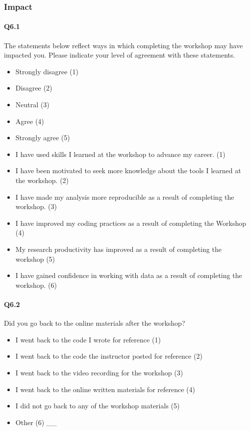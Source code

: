 \documentclass[030-workshop.tex]{subfiles}
\begin{document}
\subsubsection{Impact}

    \paragraph{Q6.1}

        The statements below reflect ways in which completing the workshop may have impacted you.
        Please indicate your level of agreement with these statements.

        \begin{itemize}
            \item Strongly disagree (1)
            \item Disagree (2)
            \item Neutral (3)
            \item Agree (4)
            \item Strongly agree (5)
        \end{itemize}

        \begin{itemize}
            \item I have used skills I learned at the workshop to advance my career. (1)
            \item I have been motivated to seek more knowledge about the tools I learned at the workshop. (2)
            \item I have made my analysis more reproducible as a result of completing the workshop. (3)
            \item I have improved my coding practices as a result of completing the Workshop (4)
            \item My research productivity has improved as a result of completing the workshop (5)
            \item I have gained confidence in working with data as a result of completing the workshop. (6)
        \end{itemize}

    \paragraph{Q6.2}

        Did you go back to the online materials after the workshop?

        \begin{itemize}
            \item I went back to the code I wrote for reference  (1)
            \item I went back to the code the instructor posted for reference  (2)
            \item I went back to the video recording for the workshop  (3)
            \item I went back to the online written materials for reference  (4)
            \item I did not go back to any of the workshop materials  (5)
            \item Other  (6) \_\_
        \end{itemize}
\end{document}

